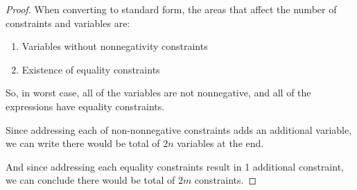 \documentclass[12pt]{article}
\begin{document}
\begin{enumerate}[1.]
\begin{proof}
    \bigskip

    When converting to standard form, the areas that affect the number of constraints
    and variables are:

    \begin{enumerate}[1.]
        \item Variables without nonnegativity constraints
        \item Existence of equality constraints
    \end{enumerate}

    \bigskip

    So, in worst case, all of the variables are not nonnegative, and all of the
    expressions have equality constraints.

    \bigskip

    Since addressing each of non-nonnegative constraints adds an additional variable,
    we can write there would be total of $2n$ variables at the end.

    \bigskip

    And since addressing each equality constraints result in 1 additional constraint,
    we can conclude there would be total of $2m$ constraints.

    \end{proof}

    \bigskip












\end{enumerate}
\end{document}
